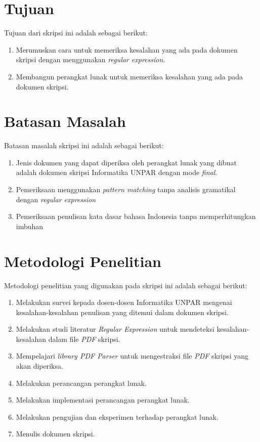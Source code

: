 \section{Tujuan}
\label{sec:tujuan}
Tujuan dari skripsi ini adalah sebagai berikut:
\begin{enumerate}
	\item Merumuskan cara untuk memeriksa kesalahan yang ada pada dokumen skripsi dengan menggunakan \textit{regular expression}.
	\item Membangun perangkat lunak untuk memeriksa kesalahan yang ada pada dokumen skripsi.
\end{enumerate}

\section{Batasan Masalah}
\label{sec:batasan}
Batasan masalah skripsi ini adalah sebagai berikut:
\begin{enumerate}
	\item Jenis dokumen yang dapat diperiksa oleh perangkat lunak yang dibuat adalah dokumen skripsi Informatika UNPAR dengan mode \textit{final}.
	\item Pemeriksaan menggunakan \textit{pattern matching} tanpa analisis gramatikal dengan \textit{regular expression}
	\item Pemeriksaan penulisan kata dasar bahasa Indonesia tanpa memperhitungkan imbuhan
\end{enumerate}

\section{Metodologi Penelitian}
\label{sec:metlit}
Metodologi penelitian yang digunakan pada skripsi ini adalah sebagai berikut:
\begin{enumerate}
	\item Melakukan survei kepada dosen-dosen Informatika UNPAR mengenai kesalahan-kesalahan penulisan yang ditemui dalam dokumen skripsi.
	\item Melakukan studi literatur \textit{Regular Expression} untuk mendeteksi kesalahan-kesalahan dalam file \textit{PDF} skripsi.
	\item Mempelajari \textit{library PDF Parser} untuk mengestraksi file \textit{PDF} skripsi yang akan diperiksa.
	\item Melakukan perancangan perangkat lunak.
	\item Melakukan implementasi perancangan perangkat lunak.
	\item Melakukan pengujian dan eksperimen terhadap perangkat lunak.
	\item Menulis dokumen skripsi.
\end{enumerate}

